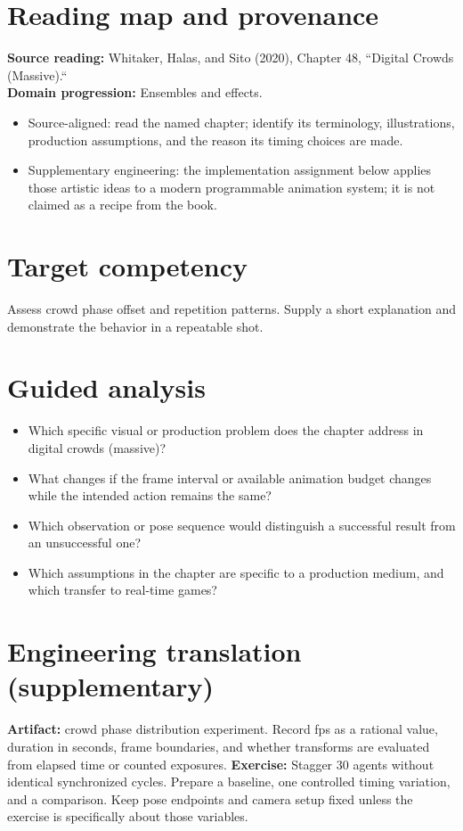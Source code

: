\documentclass[10pt,letterpaper]{article}
\begin{document}
\makedoctitle
\makedocsummary

\section{Reading map and provenance}
\textbf{Source reading:} Whitaker, Halas, and Sito (2020), Chapter 48, ``Digital Crowds (Massive).``\\
\textbf{Domain progression:} Ensembles and effects.
\begin{itemize}
\item Source-aligned: read the named chapter; identify its terminology, illustrations, production assumptions, and the reason its timing choices are made.
\item Supplementary engineering: the implementation assignment below applies those artistic ideas to a modern programmable animation system; it is not claimed as a recipe from the book.
\end{itemize}
\section{Target competency}
Assess crowd phase offset and repetition patterns. Supply a short explanation and demonstrate the behavior in a repeatable shot.
\section{Guided analysis}
\begin{itemize}
\item Which specific visual or production problem does the chapter address in digital crowds (massive)?
\item What changes if the frame interval or available animation budget changes while the intended action remains the same?
\item Which observation or pose sequence would distinguish a successful result from an unsuccessful one?
\item Which assumptions in the chapter are specific to a production medium, and which transfer to real-time games?
\end{itemize}
\section{Engineering translation (supplementary)}
\textbf{Artifact:} crowd phase distribution experiment. Record fps as a rational value, duration in seconds, frame boundaries, and whether transforms are evaluated from elapsed time or counted exposures.
\textbf{Exercise:} Stagger 30 agents without identical synchronized cycles. Prepare a baseline, one controlled timing variation, and a comparison. Keep pose endpoints and camera setup fixed unless the exercise is specifically about those variables.
\end{document}
